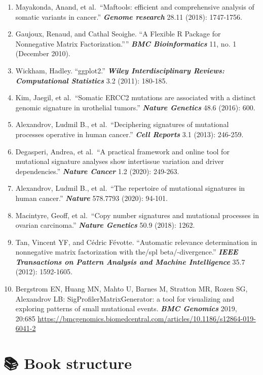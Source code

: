 \documentclass[
  12pt,
  a4paper,
  twoside]{book}
\providecommand{\tightlist}{%
  \setlength{\itemsep}{0pt}\setlength{\parskip}{0pt}}
\begin{document}
\begin{enumerate}
\def\labelenumi{\arabic{enumi}.}
\tightlist
\item
  Mayakonda, Anand, et al.~``Maftools: efficient and comprehensive
  analysis of somatic variants in cancer.'' \textbf{\emph{Genome research}} 28.11
  (2018): 1747-1756.
\item
  Gaujoux, Renaud, and Cathal Seoighe. ``A Flexible R Package for
  Nonnegative Matrix Factorization.'''' \textbf{\emph{BMC Bioinformatics}} 11, no. 1
  (December 2010).
\item
  Wickham, Hadley. ``ggplot2.'' \textbf{\emph{Wiley Interdisciplinary Reviews: Computational Statistics}} 3.2 (2011): 180-185.
\item
  Kim, Jaegil, et al.~``Somatic ERCC2 mutations are associated with a
  distinct genomic signature in urothelial tumors.'' \textbf{\emph{Nature Genetics}}
  48.6 (2016): 600.
\item
  Alexandrov, Ludmil B., et al.~``Deciphering signatures of mutational
  processes operative in human cancer.'' \textbf{\emph{Cell Reports}} 3.1 (2013):
  246-259.
\item
  Degasperi, Andrea, et al.~``A practical framework and online tool for
  mutational signature analyses show intertissue variation and driver
  dependencies.'' \textbf{\emph{Nature Cancer}} 1.2 (2020): 249-263.
\item
  Alexandrov, Ludmil B., et al.~``The repertoire of mutational
  signatures in human cancer.'' \textbf{\emph{Nature}} 578.7793 (2020): 94-101.
\item
  Macintyre, Geoff, et al.~``Copy number signatures and mutational
  processes in ovarian carcinoma.'' \textbf{\emph{Nature Genetics}} 50.9 (2018): 1262.
\item
  Tan, Vincent YF, and Cédric Févotte. ``Automatic relevance
  determination in nonnegative matrix factorization with the/spl
  beta/-divergence.'' \textbf{\emph{IEEE Transactions on Pattern Analysis and Machine Intelligence}} 35.7 (2012): 1592-1605.
\item
  Bergstrom EN, Huang MN, Mahto U, Barnes M, Stratton MR, Rozen SG,
  Alexandrov LB: SigProfilerMatrixGenerator: a tool for visualizing
  and exploring patterns of small mutational events. \textbf{\emph{BMC Genomics}}
  2019, 20:685
  \url{https://bmcgenomics.biomedcentral.com/articles/10.1186/s12864-019-6041-2}
\end{enumerate}

\hypertarget{book-structure}{%
\section*{📚 Book structure}\label{book-structure}}
\end{document}
